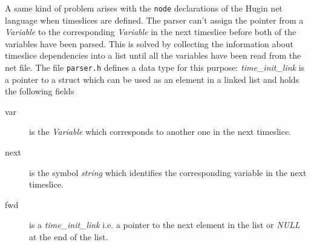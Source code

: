 \documentclass[12pt,a4paper]{report}
\newcommand{\cdatatype}[1]{{\it #1}}
\newcommand{\examplecode}[1]{\texttt{#1}}
\newcommand{\cfilename}[1]{\texttt{#1}}
\begin{document}
A same kind of problem arises with the \examplecode{node} declarations 
of the Hugin net language when timeslices are defined. The parser 
can't assign the pointer from a \cdatatype{Variable} to the 
corresponding \cdatatype{Variable} in the next timeslice before both
of the variables have been parsed. This is solved by collecting the 
information about timeslice dependencies into a list until all the 
variables have been read from the net file. The file
\cfilename{parser.h} defines a data type for this purpose: 
\cdatatype{time\_init\_link} is a pointer to a struct which can be
used as an element in a linked list and holds the following fields
\begin{description}
\item[var] is the \cdatatype{Variable} which corresponds
to another one in the next timeslice.

\item[next] is the symbol \cdatatype{string} which identifies the
corresponding variable in the next timeslice.

\item[fwd] is a \cdatatype{time\_init\_link} i.e. a pointer to the next
element in the list or \cdatatype{NULL} at the end of the list.
\end{description}
\end{document}
